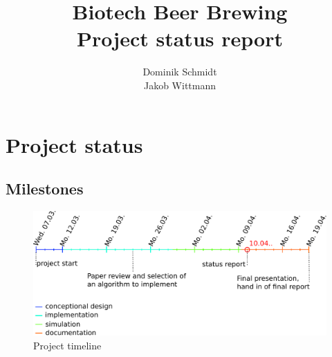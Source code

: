\documentclass[a4paper,10pt]{article}
\title{Biotech Beer Brewing\\Project status report}
\author{Dominik Schmidt\\Jakob Wittmann}
\begin{document}
\maketitle


\section{Project status}



\subsection{Milestones}

\begin{figure}[h]
 \centering
 \includegraphics[width=\linewidth]{timeline.pdf}
 \caption{Project timeline}
 \label{fig:project_timeline}
\end{figure}
\end{document}
